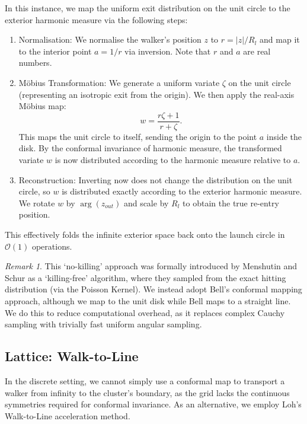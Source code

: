 \documentclass[12pt, a4paper, oneside]{report}
\theoremstyle{remark}
\newtheorem{remark}[theorem]{Remark}
\begin{document}
In this instance, we map the uniform exit distribution on the unit circle to the exterior harmonic measure via the following steps:
 \begin{enumerate}
    \item Normalisation: We normalise the walker's position $z$ to $r = |z|/R_l$ and map it to the interior point $a = 1/r$ via inversion. Note that $r$ and $a$ are real numbers.
    \item Möbius Transformation: We generate a uniform variate $\zeta$ on the unit circle (representing an isotropic exit from the origin). We then apply the real-axis Möbius map:
    \begin{equation}
        w = \frac{r\zeta + 1}{r + \zeta}.
    \end{equation}
    This maps the unit circle to itself, sending the origin to the point $a$ inside the disk. By the conformal invariance of harmonic measure, the transformed variate $w$ is now distributed according to the harmonic measure relative to $a$.
    \item Reconstruction: Inverting now does not change the distribution on the unit circle, so $w$ is distributed exactly according to the exterior harmonic measure. We rotate $w$ by $\arg(z_{out})$ and scale by $R_l$ to obtain the true re-entry position.
\end{enumerate}
This effectively folds the infinite exterior space back onto the launch circle in $\mathcal{O}(1)$ operations. 

\begin{remark}
This `no-killing' approach was formally introduced by Menshutin and Schur \cite{menshutin2006} as a `killing-free' algorithm, where they sampled from the exact hitting distribution (via the Poisson Kernel). We instead adopt Bell's conformal mapping approach, although we map to the unit disk while Bell maps to a straight line. We do this to reduce computational overhead, as it replaces complex Cauchy sampling with trivially fast uniform angular sampling.
\end{remark}

\subsection{Lattice: Walk-to-Line}
\label{sec:lattice_wtl}

In the discrete setting, we cannot simply use a conformal map to transport a walker from infinity to the cluster's boundary, as the grid lacks the continuous symmetries required for conformal invariance. As an alternative, we employ Loh's Walk-to-Line acceleration method.
\end{document}
